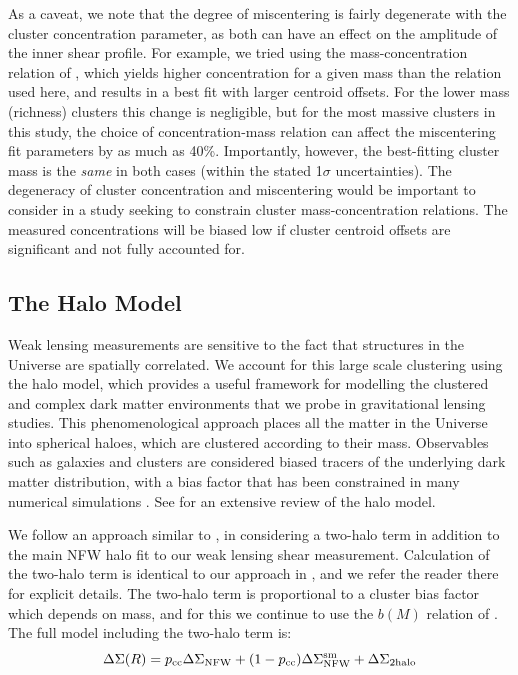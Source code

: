 As a caveat, we note that the degree of miscentering is fairly degenerate with the cluster concentration parameter, as both can have an effect on the amplitude of the inner shear profile. For example, we tried using the mass-concentration relation of \citet{Prada12}, which yields higher concentration for a given mass than the \citet{Dutton14} relation used here, and results in a best fit with larger centroid offsets. For the lower mass (richness) clusters this change is negligible, but for the most massive clusters in this study, the choice of concentration-mass relation can affect the miscentering fit parameters by as much as 40\%. Importantly, however, the best-fitting cluster mass is the {\it same} in both cases (within the stated 1$\sigma$ uncertainties). The degeneracy of cluster concentration and miscentering would be important to consider in a study seeking to constrain cluster mass-concentration relations. The measured concentrations will be biased low if cluster centroid offsets are significant and not fully accounted for.



\subsection{The Halo Model}
\label{sec:halomodel}
Weak lensing measurements are sensitive to the fact that structures in the Universe are spatially correlated. We account for this large scale clustering using the halo model, which provides a useful framework for modelling the clustered and complex dark matter environments that we probe in gravitational lensing studies. This phenomenological approach places all the matter in the Universe into spherical haloes, which are clustered according to their mass. Observables such as galaxies and clusters are considered biased tracers of the underlying dark matter distribution, with a bias factor that has been constrained in many numerical simulations \citep[e.g.][]{Mo96,Sheth99,Tinker10}. See \citet{Cooray02} for an extensive review of the halo model.

We follow an approach similar to \citet{Johnston07}, in considering a two-halo term in addition to the main \ac{NFW} halo fit to our weak lensing shear measurement. Calculation of the two-halo term is identical to our approach in \citet{Ford14}, and we refer the reader there for explicit details. The two-halo term is proportional to a cluster bias factor which depends on mass, and for this we continue to use the $b(M)$ relation of \citet{Seljak04}. The full model including the two-halo term is:
\begin{equation}
\Delta\Sigma(R) = p_{\mathrm{cc}}\Delta\Sigma_{\mathrm{NFW}} +(1-p_{\mathrm{cc}})\Delta\Sigma_{\mathrm{NFW}}^{\rm sm} + \Delta\Sigma_{\mathrm{2halo}}
\label{modelEQ}
\end{equation}

